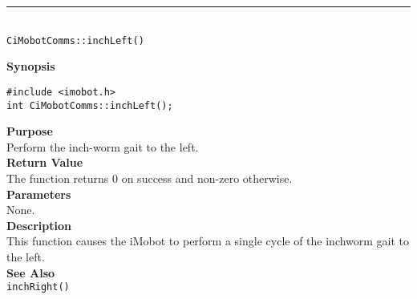 \noindent
\vspace{5pt}
\rule{4.5in}{0.015in}\\
\noindent
{\LARGE \texttt{CiMobotComms::inchLeft()}}\\
{}

\noindent
{\bf Synopsis}\\
\begin{verbatim}
#include <imobot.h>
int CiMobotComms::inchLeft();
\end{verbatim}

\noindent
{\bf Purpose}\\
Perform the inch-worm gait to the left.\\

\noindent
{\bf Return Value}\\
The function returns 0 on success and non-zero otherwise.\\

\noindent
{\bf Parameters}\\
None.\\

\noindent
{\bf Description}\\
This function causes the iMobot to perform a single cycle of the inchworm gait
to the left.\\

\noindent
{\bf See Also}\\
\texttt{inchRight()}

